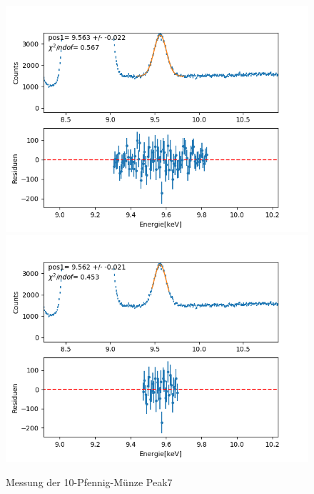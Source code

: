 \documentclass[12pt,a4paper]{article}
\begin{document}
\begin{figure}[H]
\centering
\includegraphics[scale=0.49]{Bilder/roentgen_spektren/pfennig/pfen7_1.png}
\includegraphics[scale=0.49]{Bilder/roentgen_spektren/pfennig/pfen7_2.png}
\caption{Messung der 10-Pfennig-Münze Peak7}
\end{figure}
\end{document}
